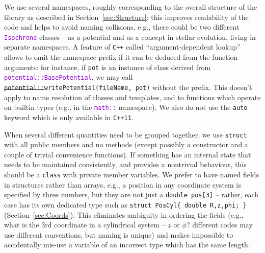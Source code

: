 \documentclass[12pt]{article}
\newcommand{\Cpp}  {\texttt{C++}\xspace}
\newcommand{\CppII}{\texttt{C++11}\xspace}
\newcommand{\ttt}[1]{\textcolor{darkviolet}{\texttt{#1}}}
\begin{document}
We use several namespaces, roughly corresponding to the overall structure of the library as described in Section~\ref{sec:Structure}: this improves readability of the code and helps to avoid naming collisions, e.g., there could be two different \ttt{Isochrone} classes -- as a potential and as a concept in stellar evolution, living in separate namespaces. A feature of \Cpp called ``argument-dependent lookup'' allows to omit the namespace prefix if it can be deduced from the function arguments: for instance, if \texttt{pot} is an instance of class derived from \ttt{potential::BasePotential}, we may call \texttt{\sout{potential::}writePotential(fileName, pot)} without the prefix. This doesn't apply to name resolution of classes and templates, and to functions which operate on builtin types (e.g., in the \ttt{math::} namespace). We also do not use the \texttt{auto} keyword which is only available in \CppII.

When several different quantities need to be grouped together, we use \texttt{struct} with all public members and no methods (except possibly a constructor and a couple of trivial convenience functions). If something has an internal state that needs to be maintained consistently, and provides a nontrivial behaviour, this should be a \texttt{class} with private member variables. We prefer to have named fields in structures rather than arrays, e.g., a position in any coordinate system is specified by three numbers, but they are not just a \texttt{double pos[3]} -- rather, each case has its own dedicated type such as \texttt{struct PosCyl\{ double R,z,phi; \}} (Section~\ref{sec:Coords}). This eliminates ambiguity in ordering the fields (e.g., what is the 3rd coordinate in a cylindrical system -- $z$ or $\phi$? different codes may use different conventions, but naming is unique) and makes impossible to accidentally mis-use a variable of an incorrect type which has the same length.
\end{document}
